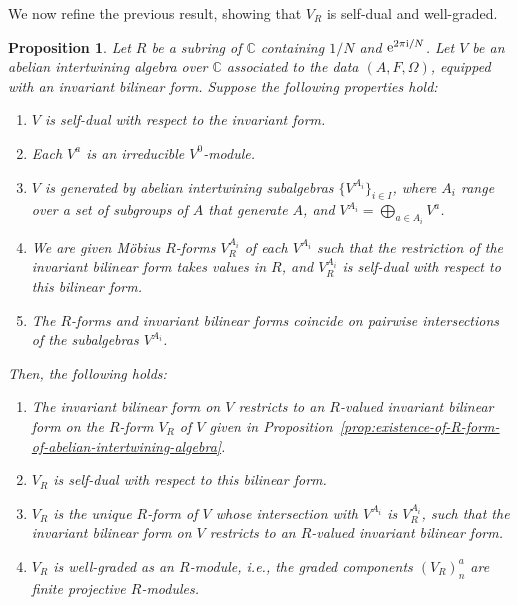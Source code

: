 \documentclass[pdftex]{sigma}
\newcommand{\bC}{\mathbb{C}}
\newtheorem{prop}[thm]{Proposition}
\theoremstyle{definition}
\begin{document}
We now refine the previous result, showing that $V_R$ is self-dual and well-graded.

\begin{prop} \label{prop:extension-of-self-dual-form}Let $R$ be a subring of $\bC$ containing $1/N$ and ${\rm e}^{2\pi {\rm i}/N}$. Let $V$ be an abelian intertwining algebra over $\bC$ associated to the data $(A,F,\Omega)$, equipped with an invariant bilinear form. Suppose the following properties hold:
\begin{enumerate}\itemsep=0pt
\item[$1.$] $V$ is self-dual with respect to the invariant form.
\item[$2.$] Each $V^a$ is an irreducible $V^0$-module.
\item[$3.$] $V$ is generated by abelian intertwining subalgebras $\big\{V^{A_i}\big\}_{i \in I}$, where $A_i$ range over a set of subgroups of $A$ that generate $A$, and $V^{A_i} = \bigoplus_{a \in A_i} V^a$.
\item[$4.$] We are given M\"obius $R$-forms $V^{A_i}_R$ of each $V^{A_i}$ such that the restriction of the invariant bilinear form takes values in $R$, and $V^{A_i}_R$ is self-dual with respect to this bilinear form.
\item[$5.$] The $R$-forms and invariant bilinear forms coincide on pairwise intersections of the subalgebras $V^{A_i}$.
\end{enumerate}
Then, the following holds:
\begin{enumerate}\itemsep=0pt
\item[$1.$] The invariant bilinear form on $V$ restricts to an $R$-valued invariant bilinear form on the $R$-form $V_R$ of $V$ given in Proposition~{\rm \ref{prop:existence-of-R-form-of-abelian-intertwining-algebra}}.
\item[$2.$] $V_R$ is self-dual with respect to this bilinear form.
\item[$3.$] $V_R$ is the unique $R$-form of $V$ whose intersection with $V^{A_i}$ is $V^{A_i}_R$, such that the invariant bilinear form on $V$ restricts to an $R$-valued invariant bilinear form.
\item[$4.$] $V_R$ is well-graded as an $R$-module, i.e., the graded components $(V_R)^a_n$ are finite projective $R$-modules.
\end{enumerate}
\end{prop}
\end{document}
